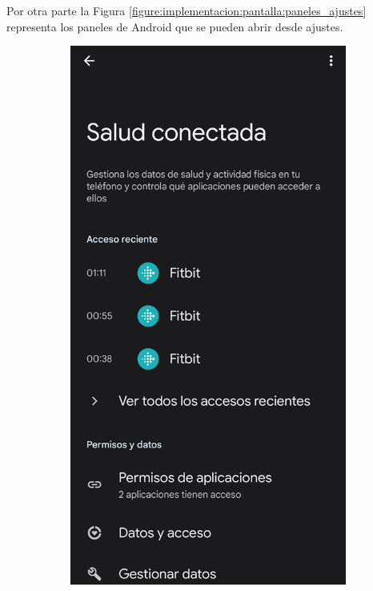                 Por otra parte la Figura \ref{figure:implementacion:pantalla:paneles_ajustes} representa los paneles de Android que se pueden abrir desde ajustes.
                
                \begin{figure}[htbp]
                	\centering
                	\begin{subfigure}[c]{0.29\textwidth}
                		\centering
                		\includegraphics[width=1\textwidth]{figures/pantallas/Salud Conectada.png}

\end{subfigure}
\end{figure}
